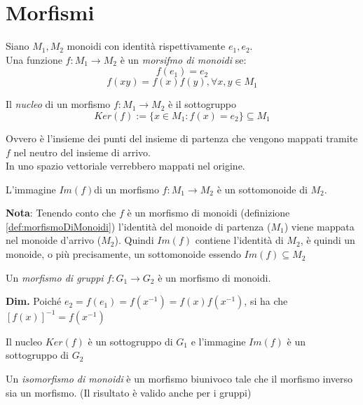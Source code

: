    
    \section{Morfismi}
        \begin{definition}\label{def:morfismoDiMonoidi}
            Siano $M_1, M_2$ monoidi con identità rispettivamente $e_1, e_2$.\\
            Una funzione $f: M_1 \rightarrow M_2$ è un \emph{morsifmo di monoidi} se:
            $$f(e_1) = e_2$$
            $$f(xy) = f(x)f(y), \forall x,y \in M_1$$
        \end{definition}
        \begin{definition}
            Il \emph{nucleo} di un morfismo $f:M_1 \rightarrow M_2$ è il sottogruppo
            $$Ker(f):= \{x \in M_1 : f(x) = e_2\} \subseteq M_1$$
        \end{definition}
        Ovvero è l'insieme dei punti del insieme di partenza che vengono mappati tramite $f$ nel neutro del insieme di arrivo.\\
        In uno spazio vettoriale verrebbero mappati nel origine.\\
        \begin{property}
            L'immagine $Im(f)$di un morfismo $f: M_1 \rightarrow M_2$ è un sottomonoide di $M_2$.
        \end{property}
        \textbf{Nota}: Tenendo conto che $f$ è un morfismo di monoidi (definizione \ref{def:morfismoDiMonoidi}) l'identità del monoide di partenza ($M_1$) viene mappata nel monoide d'arrivo ($M_2$).
        Quindi $Im(f)$ contiene l'identità di $M_2$, è quindi un monoide, o più precisamente, un sottomonoide essendo $Im(f) \subseteq M_2$ 
        
        \begin{property}
            Un \emph{morfismo di gruppi} $f:G_1 \rightarrow G_2$ è un morfismo di monoidi.
        \end{property}
        \textbf{Dim.} Poiché $e_2 = f(e_1) = f(x^{-1}) = f(x)f(x^{-1})$, si ha che $[f(x)]^{-1} = f(x^{-1})$
        
        Il nucleo $Ker(f)$ è un sottogruppo di $G_1$ e l'immagine $Im(f)$ è un sottogruppo di $G_2$
        \begin{definition}
            Un \emph{isomorfismo di monoidi} è un morfismo biunivoco tale che il morfismo inverso sia un morfismo. (Il risultato è valido anche per i gruppi)
        \end{definition}

